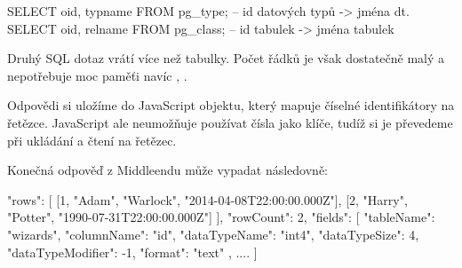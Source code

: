 \begin{code}
SELECT oid, typname FROM pg_type; -- id datových typů -> jména dt.
SELECT oid, relname FROM pg_class; -- id tabulek -> jména tabulek
\end{code}

Druhý SQL dotaz vrátí více než tabulky. Počet řádků je však dostatečně malý a nepotřebuje
moc paměťi navíc \citep[viz][]{PgType}, \citep[viz][]{PgClass}.

Odpovědi si uložíme do JavaScript objektu, který mapuje číselné identifikátory na řetězce.
JavaScript ale neumožňuje používat čísla jako klíče, tudíž si je převedeme při ukládání a
čtení na řetězec.

Konečná odpověď z Middleendu může vypadat následovně:

\begin{code}
{
    "rows": [
        [1, "Adam", "Warlock", "2014-04-08T22:00:00.000Z"],
        [2, "Harry", "Potter", "1990-07-31T22:00:00.000Z"]
    ],
    "rowCount": 2,
    "fields": [
        {
            "tableName": "wizards",
            "columnName": "id",
            "dataTypeName": "int4",
            "dataTypeSize": 4,
            "dataTypeModifier": -1,
            "format": "text"
        },
        ....
    ]
}
\end{code}
